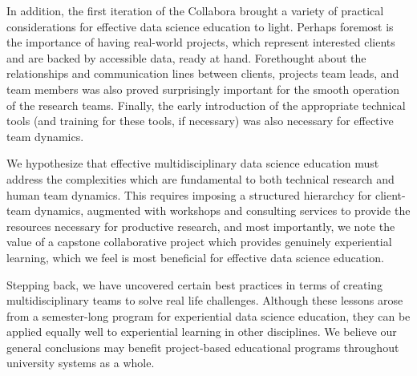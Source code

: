 \documentclass{sig-alternate}
\begin{document}
In addition, the first iteration of the Collabora brought a variety of practical considerations for effective data science education to light.  Perhaps foremost is the importance of having real-world projects, which represent interested clients and are backed by accessible data, ready at hand.  Forethought about the relationships and communication lines between clients, projects team leads, and team members was also proved surprisingly important for the smooth operation of the research teams.  Finally, the early introduction of the appropriate technical tools (and training for these tools, if necessary) was also necessary for effective team dynamics.

We hypothesize that effective multidisciplinary data science education must address the complexities which are fundamental to both technical research and human team dynamics. This requires imposing a structured hierarchcy for client-team dynamics, augmented with workshops and consulting services to provide the resources necessary for productive research, and most importantly, we note the value of a capstone collaborative project which provides genuinely experiential learning, which we feel is most beneficial for effective data science education.

Stepping back, we have uncovered certain best practices in terms of creating multidisciplinary teams to solve real life challenges.  Although these lessons arose from a semester-long program for experiential data science education, they can be applied equally well to experiential learning in other disciplines.  We believe our general conclusions may benefit project-based educational programs throughout university systems as a whole.
\end{document}

